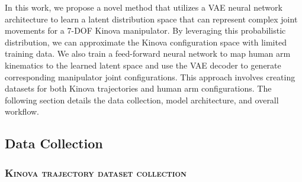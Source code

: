 


In this work, we propose a novel method that utilizes a VAE neural network architecture to learn a latent distribution space that can represent complex joint movements for a 7-DOF Kinova manipulator. By leveraging this probabilistic distribution, we can approximate the Kinova configuration space with limited training data. We also train a feed-forward neural network to map human arm kinematics to the learned latent space and use the VAE decoder to generate corresponding manipulator joint configurations. This approach involves creating datasets for both Kinova trajectories and human arm configurations. The following section details the data collection, model architecture, and overall workflow.

\vspace{-2.2mm}

\subsection{Data Collection}
\vspace{-1mm}
\subsubsection{\textbf{\textsc{Kinova trajectory dataset collection}}}\label{kinova_data}

